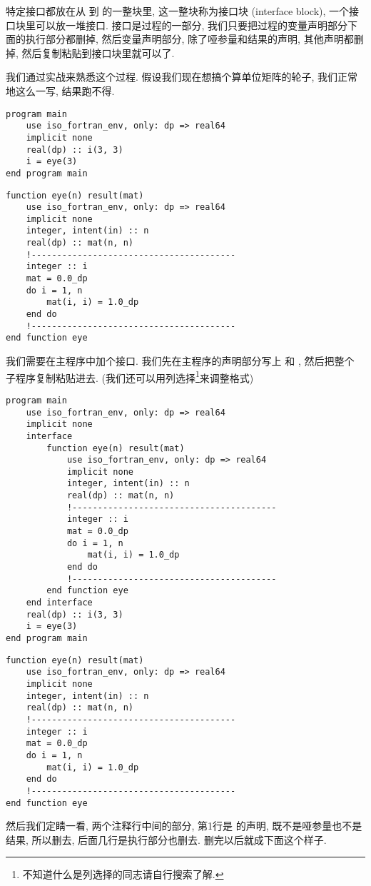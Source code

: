 特定接口都放在从  到  的一整块里, 这一整块称为接口块 (interface block), 一个接口块里可以放一堆接口. 接口是过程的一部分, 我们只要把过程的变量声明部分下面的执行部分都删掉, 然后变量声明部分, 除了哑参量和结果的声明, 其他声明都删掉, 然后复制粘贴到接口块里就可以了. 

我们通过实战来熟悉这个过程. 假设我们现在想搞个算单位矩阵的轮子, 我们正常地这么一写, 结果跑不得. 
\begin{lstlisting} 
program main
    use iso_fortran_env, only: dp => real64
    implicit none
    real(dp) :: i(3, 3)
    i = eye(3)
end program main
\end{lstlisting}
\begin{lstlisting}
function eye(n) result(mat)
    use iso_fortran_env, only: dp => real64
    implicit none
    integer, intent(in) :: n
    real(dp) :: mat(n, n)
    !----------------------------------------
    integer :: i
    mat = 0.0_dp
    do i = 1, n
        mat(i, i) = 1.0_dp
    end do
    !----------------------------------------
end function eye
\end{lstlisting} 
我们需要在主程序中加个接口. 我们先在主程序的声明部分写上  和 , 然后把整个  子程序复制粘贴进去. (我们还可以用列选择\footnote{不知道什么是列选择的同志请自行搜索了解.}来调整格式)
\begin{lstlisting} 
program main
    use iso_fortran_env, only: dp => real64
    implicit none
    interface
        function eye(n) result(mat)
            use iso_fortran_env, only: dp => real64
            implicit none
            integer, intent(in) :: n
            real(dp) :: mat(n, n)
            !----------------------------------------
            integer :: i
            mat = 0.0_dp
            do i = 1, n
                mat(i, i) = 1.0_dp
            end do
            !----------------------------------------
        end function eye
    end interface
    real(dp) :: i(3, 3)
    i = eye(3)
end program main
\end{lstlisting}
\begin{lstlisting}
function eye(n) result(mat)
    use iso_fortran_env, only: dp => real64
    implicit none
    integer, intent(in) :: n
    real(dp) :: mat(n, n)
    !----------------------------------------
    integer :: i
    mat = 0.0_dp
    do i = 1, n
        mat(i, i) = 1.0_dp
    end do
    !----------------------------------------
end function eye
\end{lstlisting} 
然后我们定睛一看, 两个注释行中间的部分, 第1行是  的声明,  既不是哑参量也不是结果, 所以删去, 后面几行是执行部分也删去. 删完以后就成下面这个样子. 
